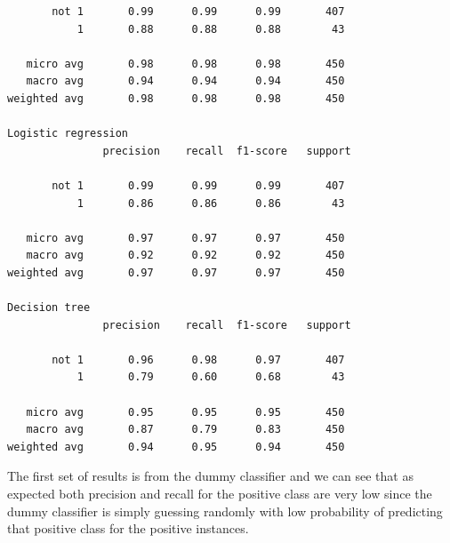 \begin{multicols}{2}
{\begin{verbatim}
       not 1       0.99      0.99      0.99       407
           1       0.88      0.88      0.88        43

   micro avg       0.98      0.98      0.98       450
   macro avg       0.94      0.94      0.94       450
weighted avg       0.98      0.98      0.98       450

Logistic regression
               precision    recall  f1-score   support

       not 1       0.99      0.99      0.99       407
           1       0.86      0.86      0.86        43

   micro avg       0.97      0.97      0.97       450
   macro avg       0.92      0.92      0.92       450
weighted avg       0.97      0.97      0.97       450

Decision tree
               precision    recall  f1-score   support

       not 1       0.96      0.98      0.97       407
           1       0.79      0.60      0.68        43

   micro avg       0.95      0.95      0.95       450
   macro avg       0.87      0.79      0.83       450
weighted avg       0.94      0.95      0.94       450
\end{verbatim}
}

The first set of results is from the dummy classifier and we can see that as expected both precision and recall for the positive class are very low since the dummy classifier is simply guessing randomly with low probability of predicting that positive class for the positive instances. 

\end{multicols}